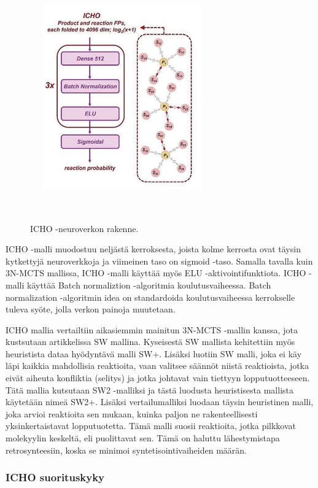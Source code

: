 \documentclass[finnish,twoside,censored,tkt,sw-line]{HYthesisML}
\begin{document}
\begin{figure}[ht]
    \centering
    \includegraphics[width=8cm, height=8cm]{icho-neuralnetwork.png}
    \caption{ICHO -neuroverkon rakenne.}
    {~\cite{ExpertKnowledgeRetorsynthesis}}
\end{figure}

ICHO -malli muodostuu neljästä kerroksesta, joista kolme kerrosta ovat täysin kytkettyjä neuroverkkoja ja viimeinen taso on sigmoid -taso.
Samalla tavalla kuin 3N-MCTS mallissa, ICHO -malli käyttää myös ELU -aktivointifunktiota.
ICHO -malli käyttää Batch normaliztion -algoritmia koulutusvaiheessa.
Batch normalization -algoritmin idea on standardoida koulutusvaiheessa kerrokselle tuleva syöte, jolla verkon painoja muutetaan.

ICHO mallia vertailtiin aikasiemmin mainitun 3N-MCTS -mallin kanssa, jota kustsutaan artikkelissa SW mallina.
Kyseisestä SW mallista kehitettiin myös heuristista dataa hyödyntävä malli SW+.
Lisäksi luotiin SW malli, joka ei käy läpi kaikkia mahdollisia reaktioita, vaan valitsee säännöt niistä reaktioista, jotka eivät aiheuta konfliktia (selitys) ja jotka johtavat vain tiettyyn lopputuotteeseen.
Tätä mallia kutsutaan SW2 -malliksi ja tästä luodusta heuristisesta mallista käytetään nimeä SW2+.
Lisäksi vertailumalliksi luodaan täysin heuristinen malli, joka arvioi reaktioita sen mukaan, kuinka paljon ne rakenteellisesti yksinkertaistavat lopputuotetta.
Tämä malli suosii reaktioita, jotka pilkkovat molekyylin keskeltä, eli puolittavat sen.
Tämä on haluttu lähestymistapa retrosynteesiin, koska se minimoi syntetisointivaiheiden määrän.

\subsubsection{ICHO suorituskyky}
\end{document}
